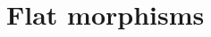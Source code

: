 \documentclass[../main.tex]{subfiles}
\begin{document}
\setcounter{chapter}{3}
\chapter{Flat morphisms}
\end{document}
